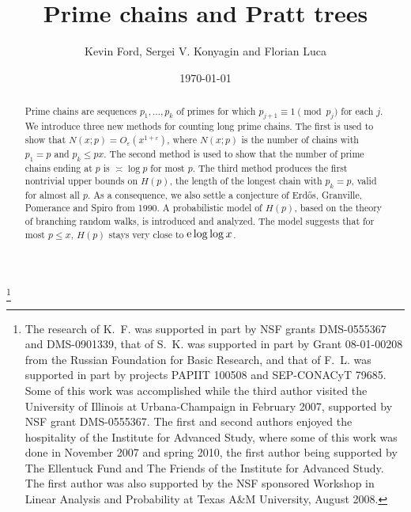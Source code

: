 \documentclass[12pt]{amsart}
\theoremstyle{remark}
\theoremstyle{plain}
\numberwithin{equation}{section}
\newcommand{\eps}{\ensuremath{\varepsilon}}
\renewcommand{\(}{\left(}
\renewcommand{\)}{\right)}
\newcommand{\er}{{\rm e}}  %
\newcommand{\order}{\asymp}  %
\renewcommand{\le}{\leqslant}
\begin{document}
\title{Prime chains and Pratt trees}

\author{Kevin Ford, Sergei V. Konyagin and Florian Luca}
\address{ KF: Department of Mathematics,
University of Illinois at Urbana-Champaign Urbana,
1409 West Green St., Urbana, IL 61801, USA}
\address{ SVK: Department of Mechanics and Mathematics,
Moscow State University, Moscow, 119992, Russia}
\address{FL : Instituto de Matem{\'a}ticas,
 Universidad Nacional Autonoma de M{\'e}xico, Ap. Postal 61-3 (Xangari),
C.P. 58089, Morelia, Michoac{\'a}n, M{\'e}xico}

\date{\today}
\begin{abstract}
Prime chains are sequences
$p_1,\ldots,p_k$ of primes for which $p_{j+1}\equiv 1\pmod{p_j}$ for
each $j$.  
We introduce three new methods for counting long prime chains.
The first is used to show that $N(x;p)=O_\eps(x^{1+\eps})$, where
$N(x;p)$ is the number of
chains with $p_1=p$ and $p_k \le px$.  The second method is used to show that
the number of prime chains ending at $p$ is $\order \log p$ for most $p$.
The third method produces the first
nontrivial upper bounds on $H(p)$, the length of the longest chain
with $p_k=p$, valid for almost all $p$.  As a consequence, we also settle a conjecture of Erd\H os, Granville, Pomerance and Spiro from 1990.
A probabilistic model of $H(p)$, based on the theory of branching
random walks, is introduced and analyzed.  The model suggests that
for most $p\le x$, $H(p)$ stays very close to $\er \log\log x$.
\end{abstract}

\thanks{The research of K.~F. was supported in part
by NSF grants DMS-0555367 and DMS-0901339,  
that of S.~K. was
supported in part by Grant 08-01-00208 from the Russian Foundation
for Basic Research, and that of F.~L. was supported in part
by projects PAPIIT 100508 and SEP-CONACyT 79685.
Some of this work was accomplished
while the third author visited the University of Illinois at
Urbana-Champaign in February 2007, supported by NSF grant DMS-0555367.
The first and second authors enjoyed the hospitality of
the Institute for Advanced Study, where some of this work was
done in November 2007 and spring 2010, the first author being supported
by The Ellentuck Fund and The Friends of the Institute for Advanced Study.
The first author was also supported by the NSF sponsored
Workshop in Linear Analysis and
Probability at Texas A\&M University, August 2008.
}
\end{document}
